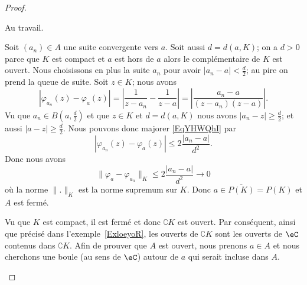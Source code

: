 \begin{proof}
\begin{subproof}
		Au travail.

		Soit \( (a_n)\in A\) une suite convergente vers \( a\). Soit aussi \( d=d(a,K)\); on a \( d>0\) parce que \( K\) est compact et \( a\) est hors de \( a\) alors le complémentaire de \( K\) est ouvert. Nous choisissons en plus la suite \( a_n\) pour avoir \( | a_n-a |<\frac{ d }{2}\); au pire on prend la queue de suite. Soit \( z\in K\); nous avons
		\begin{equation}    \label{EqYHWQhI}
			| \varphi_{a_n}(z)-\varphi_a(z) |=\left| \frac{1}{ z-a_n }-\frac{1}{ z-a } \right| =  \left| \frac{ a_n-a }{ (z-a_n)(z-a) } \right|.
		\end{equation}
		Vu que \( a_n\in B(a,\frac{ d }{2})\) et que \( z\in K\) et \( d=d(a,K)\) nous avons \( | a_n-z |\geq \frac{ d }{2}\); et aussi \( | a-z |\geq \frac{ d }{2}\). Nous pouvons donc majorer \eqref{EqYHWQhI} par
		\begin{equation}
			| \varphi_{a_n}(z)-\varphi_a(z) |\leq 2\frac{ | a_n-a | }{ d^2 }.
		\end{equation}
		Donc nous avons
		\begin{equation}
			\| \varphi_a-\varphi_{a_n} \|_K\leq 2\frac{ | a_n-a | }{ d^2 }\to 0
		\end{equation}
		où la norme \( \| . \|_K\) est la norme supremum sur \( K\). Donc \( a\in \overline{ P(K) }=P(K)\) et \( A\) est fermé.

		\spitem[Ouvert] Vu que \( K\) est compact, il est fermé et donc \( \complement K\) est ouvert. Par conséquent, ainsi que précisé dans l'exemple~\ref{ExloeyoR}, les ouverts de \( \complement K\) sont les ouverts de \( \eC\) contenus dans \( \complement K\). Afin de prouver que \( A\) est ouvert, nous prenons  \( a\in A\) et nous cherchons une boule (au sens de \( \eC\)) autour de \( a\) qui serait incluse dans \( A\).


\end{subproof}
\end{proof}
